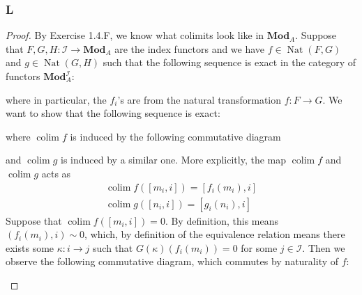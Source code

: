 \documentclass{article}
\newcommand{\fI}{\mathscr{I}}
\newcommand{\Mod}{\mathbf{Mod}} %
\DeclareMathOperator{\colim}{\mathrm{colim}}
\DeclareMathOperator{\Nat}{\mathrm{Nat}}
\begin{document}
\subsubsection{L}\label{1.6.L}
\begin{proof}
By Exercise 1.4.F, we know what colimits look like in $\Mod_A$. Suppose that $F,G,H: \fI\to \Mod_A$ are the index functors and we have $f\in \Nat(F,G)$ and $g\in \Nat( G,H)$ such that the following sequence is exact in the category of functors $\Mod_A^\fI$:
\begin{center}
\end{center}
where in particular, the $f_i$'s are from the natural transformation $f:F\to G$. We want to show that the following sequence is exact:
\begin{center}
\end{center}
where $\colim f$ is induced by the following commutative diagram
\begin{center}
\end{center}
and $\colim g$ is induced by a similar one. More explicitly, the map $\colim f$ and $\colim g$ acts as
\begin{align*}
    \colim f ([m_i,i])=[f_i(m_i),i]\\
    \colim g([n_i,i])=[g_i(n_i),i]
\end{align*}
Suppose that $\colim f([m_i,i])=0$. By definition, this means $(f_i(m_i),i)\sim 0$, which, by definition of the equivalence relation means there exists some $\kappa:i\to j$ such that $G(\kappa)(f_i(m_i))=0$ for some $j\in \fI$. Then we observe the following commutative diagram, which commutes by naturality of $f$:
\begin{center}

\end{center}
\end{proof}
\end{document}
